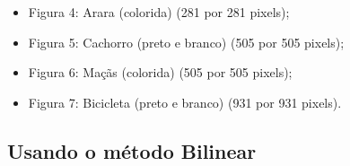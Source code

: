 \documentclass[12pt,letterpaper]{article}
\begin{document}
	\begin{figure}[h]
	\end{figure}
	
	\begin{itemize}
		\item Figura 4: Arara (colorida) (281 por 281 pixels);
		\item Figura 5: Cachorro (preto e branco) (505 por 505 pixels);
		\item Figura 6: Maçãs (colorida) (505 por 505 pixels);
		\item Figura 7: Bicicleta (preto e branco) (931 por 931 pixels).
	\end{itemize}
	
	\subsection{Usando o método Bilinear}
	
\end{document}
